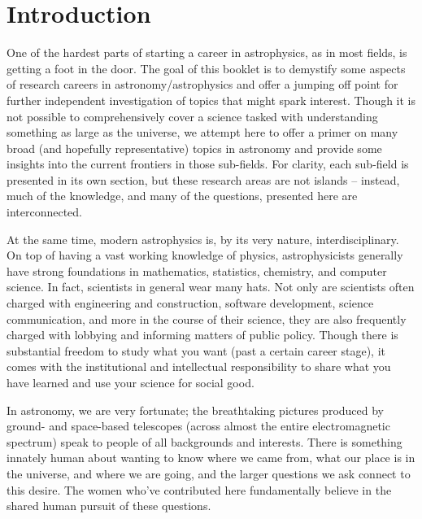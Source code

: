 \section{Introduction}

One of the hardest parts of starting a career in astrophysics, as in most fields, is getting a foot in the door. The goal of this booklet is to demystify some aspects of research careers in astronomy/astrophysics and offer a jumping off point for further independent investigation of topics that might spark interest. Though it is not possible to comprehensively cover a science tasked with understanding something as large as the universe, we attempt here to offer a primer on many broad (and hopefully representative) topics in astronomy and provide some insights into the current frontiers in those sub-fields. For clarity, each sub-field is presented in its own section, but these research areas are not islands -- instead, much of the knowledge, and many of the questions, presented here are interconnected.

At the same time, modern astrophysics is, by its very nature, interdisciplinary. On top of having a vast working knowledge of physics, astrophysicists generally have strong foundations in mathematics, statistics, chemistry, and computer science. In fact, scientists in general wear many hats. Not only are scientists often charged with engineering and construction, software development, science communication, and more in the course of their science, they are also frequently charged with lobbying and informing matters of public policy. Though there is substantial freedom to study what you want (past a certain career stage), it comes with the institutional and intellectual responsibility to share what you have learned and use your science for social good.

In astronomy, we are very fortunate; the breathtaking pictures produced by ground- and space-based telescopes (across almost the entire electromagnetic spectrum) speak to people of all backgrounds and interests. There is something innately human about wanting to know where we came from, what our place is in the universe, and where we are going, and the larger questions we ask connect to this desire. The women who've contributed here fundamentally believe in the shared human pursuit of these questions.